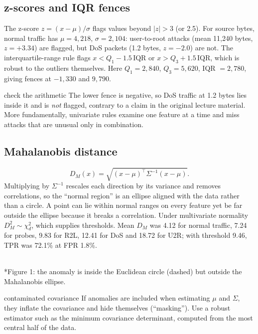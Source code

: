 \documentclass[11pt]{article}
\begin{document}
\subsection{z-scores and IQR fences}
The z-score $z=(x-\mu)/\sigma$ flags values beyond $|z|>3$ (or 2.5). For source bytes, normal traffic has $\mu=4{,}218$, $\sigma=2{,}104$: user-to-root attacks (mean 11,240 bytes, $z=+3.34$) are flagged, but DoS packets (1.2 bytes, $z=-2.0$) are not. The interquartile-range rule flags $x<Q_1-1.5\,\text{IQR}$ or $x>Q_3+1.5\,\text{IQR}$, which is robust to the outliers themselves. Here $Q_1=2{,}840$, $Q_3=5{,}620$, IQR $=2{,}780$, giving fences at $-1{,}330$ and $9{,}790$.
\begin{pitfall}{check the arithmetic}
The lower fence is negative, so DoS traffic at 1.2 bytes lies inside it and is \emph{not} flagged, contrary to a claim in the original lecture material. More fundamentally, univariate rules examine one feature at a time and miss attacks that are unusual only in combination.
\end{pitfall}

\subsection{Mahalanobis distance}
\[D_M(x)=\sqrt{(x-\mu)^\top\Sigma^{-1}(x-\mu)}.\]
Multiplying by $\Sigma^{-1}$ rescales each direction by its variance and removes correlations, so the ``normal region'' is an ellipse aligned with the data rather than a circle. A point can lie within normal ranges on every feature yet be far outside the ellipse because it breaks a correlation. Under multivariate normality $D_M^2\sim\chi^2_d$, which supplies thresholds. Mean $D_M$ was 4.12 for normal traffic, 7.24 for probes, 9.83 for R2L, 12.41 for DoS and 18.72 for U2R; with threshold 9.46, TPR was 72.1\% at FPR 1.8\%.

\begin{center}\\*{\small\color{GreyN}Figure 1: the anomaly is inside the Euclidean circle (dashed) but outside the Mahalanobis ellipse.}\end{center}
\begin{pitfall}{contaminated covariance}
If anomalies are included when estimating $\mu$ and $\Sigma$, they inflate the covariance and hide themselves (``masking''). Use a robust estimator such as the minimum covariance determinant, computed from the most central half of the data.
\end{pitfall}
\end{document}
